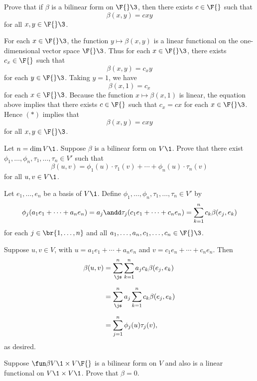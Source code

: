 
\exercise
Prove that if $\beta$ is a bilinear form on $\F{}\3$, then there exists $c \in \F{}$ such that
\[
\beta(x,y) = c x y
\]
for all $x, y \in \F{}\3$.

\begin{Solution}
For each $x \in \F{}\3$, the function $y \mapsto \beta(x,y)$ is a linear functional on the one-dimensional vector space $\F{}\3$. Thus for each $x \in \F{}\3$, there exists $c_x \in \F{}$ such that
\[ \tag{$(*)$}
\beta(x,y) = c_x y
\]
for each $y \in \F{}\3$. Taking $y = 1$, we have
\[
\beta(x, 1) = c_x
\]
for each $x \in \F{}\3$. Because the function $x \mapsto \beta(x,1)$ is linear, the equation above implies that there exists $c \in \F{}$ such that $c_x = cx$ for each $x \in \F{}\3$. Hence $(*)$ implies that
\[
\beta(x,y) = c x y
\]
for all $x, y \in \F{}\3$.
\end{Solution}

\exercise
Let $n = \dim V\1$. Suppose $\beta$ is a bilinear form on $V\1$. Prove that there exist
$\phi_1, \ldots, \phi_n, \tau_1, \ldots, \tau_n \in V'$ such that
\[
\beta(u, v) = \phi_1(u) \cdot \tau_1(v) + \cdots + \phi_n(u) \cdot \tau_n(v)
\]
for all $u, v \in V\1$.

\begin{Solution}
Let $e_1, \ldots, e_n$ be a basis of $V\1$. Define $\phi_1, \ldots, \phi_n, \tau_1, \ldots, \tau_n \in V'$ by
\[
\phi_j( a_1 e_1 + \cdots + a_n e_n ) = a_j
\andd
\tau_j( c_1 e_1 + \cdots + c_n e_n ) = \sum_{k=1}^n c_k \beta(e_j, e_k)
\]
for each $j \in \br{1, \ldots, n}$ and all $a_1, \ldots, a_n, c_1, \ldots, c_n \in \F{}\3$.

Suppose $u, v \in V$, with $u = a_1 e_1 + \cdots + a_n e_n$ and $v = c_1 e_n + \cdots + c_n e_n$. Then
\begin{align*}
\beta(u, v) &= \sum_{\js}^n \sum_{k=1}^n a_j c_k \beta(e_j, e_k) \\[6bp]
&= \sum_{\js}^n a_j \sum_{k=1}^n c_k \beta(e_j, e_k) \\[6bp]
&= \sum_{j=1}^n \phi_j(u) \tau_j(v),
 \end{align*}
 as desired.
\end{Solution}

\exercise
Suppose $\fun \beta {V\1 \times V} {\F{}}$ is a bilinear form on $V$ and also is a linear functional on $V\1 \times V\1$. Prove that
$\beta = 0$.\label{11zero}

